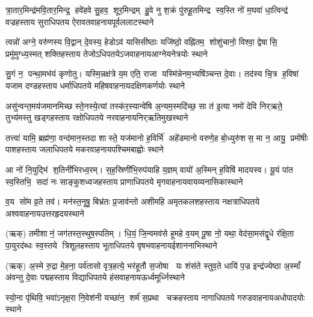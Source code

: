%
{त्रा॒तार॒मिन्द्र॑मवि॒तार॒मिन्द्र॒ हवे॑हवे सु॒हव॒ शूर॒मिन्द्रम्}%
{हु॒वे नु श॒क्रं पु॑रुहू॒तमिन्द्र स्व॒स्ति नो॑ म॒घवा॑ धा॒त्विन्द्र॑}%
{वज्रहस्ताय सुराधिपतय ऐरावतवाहनाय}{पूर्व}{ललाटस्थाने}

%
{त्वन्नो॑ अग्ने॒ वरु॑णस्य वि॒द्वान् दे॒वस्य॒ हेडोऽव॑ यासिसीष्ठाः}%
{यजि॑ष्ठो॒ वह्नि॑तम॒ शोशु॑चानो॒ विश्वा॒ द्वेषासि॒ प्रमु॑मुग्ध्य॒स्मत्}%
{शक्तिहस्ताय तेजोऽधिपतये\-ऽजवाहनाय}{आग्नेय}{नेत्रयोः स्थाने}

%
{सु॒गं न॒ पन्था॒मभ॑यं कृणोतु। यस्मि॒न्नक्ष॑त्रे य॒म एति॒ राजा}%
{यस्मि॑न्नेनम॒भ्यषि॑ञ्चन्त दे॒वाः। तद॑स्य चि॒त्र ह॒विषा॑ यजाम}%
{दण्डहस्ताय धर्माधिपतये महिषवाहनाय}{दक्षिण}{कर्णयोः स्थाने}

%
{असु॑न्वन्त॒मय॑जमानमिच्छ स्ते॒नस्ये॒त्यां तस्क॑र॒स्यान्वे॑षि}%
{अ॒न्यम॒स्मदि॑च्छ॒ सा त॑ इ॒त्या नमो॑ देवि निर्‌ऋते॒ तुभ्य॑मस्तु}%
{खड्गहस्ताय रक्षोधिपतये नरवाहनाय}{निर्‌ऋति}{मुखस्थाने}

%
{तत्त्वा॑ यामि॒ ब्रह्म॑णा॒ वन्द॑मान॒स्तदा शास्ते॒ यज॑मानो ह॒विर्भि॑}%
{अहे॑डमानो वरुणे॒ह बो॒ध्युरु॑शस॒ मा न॒ आयु॒ प्रमो॑षीः}%
{पाशहस्ताय जलाधिपतये मकरवाहनाय}{पश्चिम}{बाह्वोः स्थाने}

%
{आ नो॑ नि॒युद्भि॑ श॒तिनी॑भिरध्व॒रम्। स॒ह॒स्रिणी॑भि॒रुप॑याहि य॒ज्ञम्}%
{वायो॑ अ॒स्मिन् ह॒विषि॑ मादयस्व। यू॒यं पा॑त स्व॒स्तिभि॒ सदा॑ नः}%
{साङ्कुशध्वजहस्ताय प्राणाधिपतये मृगवाहनाय}{वायव्य}{नासिकास्थाने}

%
{व॒य सो॑म व्र॒ते तव॑। मन॑स्त॒नूषु॒ बिभ्र॑तः}%
{प्र॒जाव॑न्तो अशीमहि}%
{अमृतकलशहस्ताय नक्षत्राधिपतये अश्ववाहनाय}{उत्तर}{हृदयस्थाने}

%
{(ऋक्) तमीशानं॒ जग॑तस्त॒स्थुष॒स्पतिम्। धि॒यं॒ जि॒न्वमव॑से हूमहे व॒यम्}%
{पू॒षा नो॒ यथा॒ वेद॑सा॒मस॑द्वृ॒धे र॑क्षि॒ता पा॒युरद॑ब्धः स्व॒स्तये}
{त्रिशूलहस्ताय भूताधिपतये वृषभवाहनाय}{ईशान}{नाभिस्थाने}

%
{(ऋक्) अ॒स्मे रु॒द्रा मे॒हना॒ पर्व॑तासो वृत्र॒हत्ये॒ भर॑हूतौ स॒जोषा }%
{यः शंस॑ते स्तुव॒ते धायि॑ प॒ज्र इन्द्र॑ज्येष्ठा अ॒स्माँ अ॑वन्तु दे॒वाः}%
{पद्महस्ताय विद्याधिपतये हंसवाहनाय}{ऊर्ध्व}{मूर्ध्निस्थाने}


%
{स्यो॒ना पृ॑थिवि॒ भवा॑ऽनृक्ष॒रा नि॒वेश॑नी}%
{यच्छा॑न॒ शर्म॑ स॒प्रथा}%
{चक्रहस्ताय नागाधिपतये गरुडवाहनाय}{अधो}{पादयोः स्थाने}

